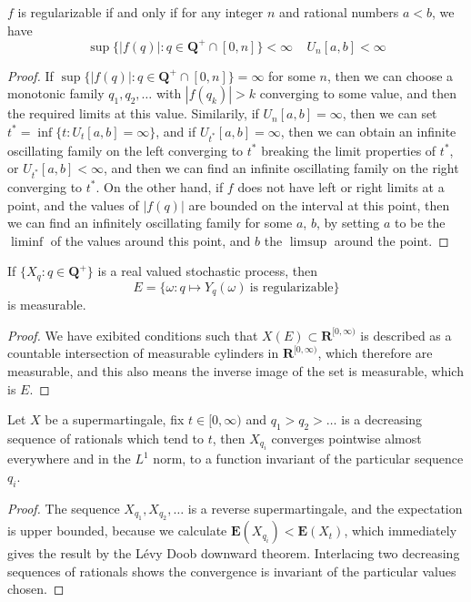 \begin{lemma}
    $f$ is regularizable if and only if for any integer $n$ and rational numbers $a < b$, we have
    \[ \sup \{ |f(q)|: q \in \mathbf{Q}^+ \cap [0,n] \} < \infty\ \ \ \ \ U_n[a,b] < \infty \]
\end{lemma}
\begin{proof}
    If $\sup \{ |f(q)|: q \in \mathbf{Q}^+ \cap [0,n] \} = \infty$ for some $n$, then we can choose a monotonic family $q_1, q_2, \dots$ with $|f(q_k)| > k$ converging to some value, and then the required limits at this value. Similarily, if $U_n[a,b] = \infty$, then we can set $t^* = \inf \{ t: U_t[a,b] = \infty \}$, and if $U_{t^*}[a,b] = \infty$, then we can obtain an infinite oscillating family on the left converging to $t^*$ breaking the limit properties of $t^*$, or $U_{t^*}[a,b] < \infty$, and then we can find an infinite oscillating family on the right converging to $t^*$. On the other hand, if $f$ does not have left or right limits at a point, and the values of $|f(q)|$ are bounded on the interval at this point, then we can find an infinitely oscillating family for some $a$, $b$, by setting $a$ to be the $\liminf$ of the values around this point, and $b$ the $\limsup$ around the point.
\end{proof}

\begin{corollary}
    If $\{ X_q : q \in \mathbf{Q}^+ \}$ is a real valued stochastic process, then
    \[ E = \{ \omega: q \mapsto Y_q(\omega)\ \text{is regularizable} \} \]
    is measurable.
\end{corollary}
\begin{proof}
    We have exibited conditions such that $X(E) \subset \mathbf{R}^{[0,\infty)}$ is described as a countable intersection of measurable cylinders in $\mathbf{R}^{[0,\infty)}$, which therefore are measurable, and this also means the inverse image of the set is measurable, which is $E$.
\end{proof}

\begin{lemma}
    Let $X$ be a supermartingale, fix $t \in [0,\infty)$ and $q_1 > q_2 > \dots$ is a decreasing sequence of rationals which tend to $t$, then $X_{q_i}$ converges pointwise almost everywhere and in the $L^1$ norm, to a function invariant of the particular sequence $q_i$.
\end{lemma}
\begin{proof}
    The sequence $X_{q_1}, X_{q_2}, \dots$ is a reverse supermartingale, and the expectation is upper bounded, because we calculate $\mathbf{E}(X_{q_i}) < \mathbf{E}(X_t)$, which immediately gives the result by the L\'{e}vy Doob downward theorem. Interlacing two decreasing sequences of rationals shows the convergence is invariant of the particular values chosen.
\end{proof}


